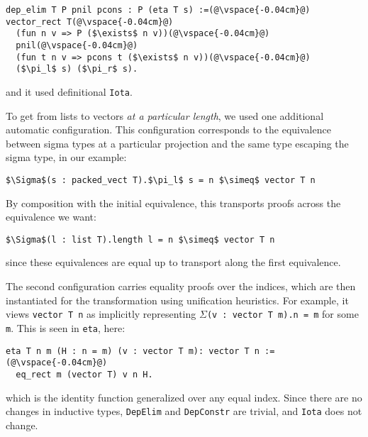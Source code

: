 \begin{lstlisting}[backgroundcolor=\color{cyan!30}]
dep_elim T P pnil pcons : P (eta T s) :=(@\vspace{-0.04cm}@)
vector_rect T(@\vspace{-0.04cm}@)
  (fun n v => P ($\exists$ n v))(@\vspace{-0.04cm}@)
  pnil(@\vspace{-0.04cm}@)
  (fun t n v => pcons t ($\exists$ n v))(@\vspace{-0.04cm}@)
  ($\pi_l$ s) ($\pi_r$ s).
\end{lstlisting}
and it used definitional \lstinline{Iota}.

To get from lists to vectors \textit{at a particular length}, we used one additional automatic configuration.
This configuration corresponds to the equivalence between sigma types at a particular projection
and the same type escaping the sigma type, in our example:

\begin{lstlisting}
$\Sigma$(s : packed_vect T).$\pi_l$ s = n $\simeq$ vector T n
\end{lstlisting}
By composition with the initial equivalence, this transports proofs
across the equivalence we want:

\begin{lstlisting}
$\Sigma$(l : list T).length l = n $\simeq$ vector T n
\end{lstlisting}
since these equivalences are equal up to transport along the first equivalence.

The second configuration carries equality proofs over the indices,
which are then instantiated for the transformation using unification heuristics.
For example, it views \lstinline{vector T n} as implicitly representing $\Sigma$\lstinline{(v : vector T m).n = m} for some \lstinline{m}.
This is seen in \lstinline{eta}, here: 

\begin{lstlisting}[backgroundcolor=\color{cyan!30}]
eta T n m (H : n = m) (v : vector T m): vector T n :=(@\vspace{-0.04cm}@)
  eq_rect m (vector T) v n H.
\end{lstlisting}
which is the identity function generalized over any equal index.
Since there are no changes in inductive types, \lstinline{DepElim} and \lstinline{DepConstr} are trivial,
and \lstinline{Iota} does not change.

